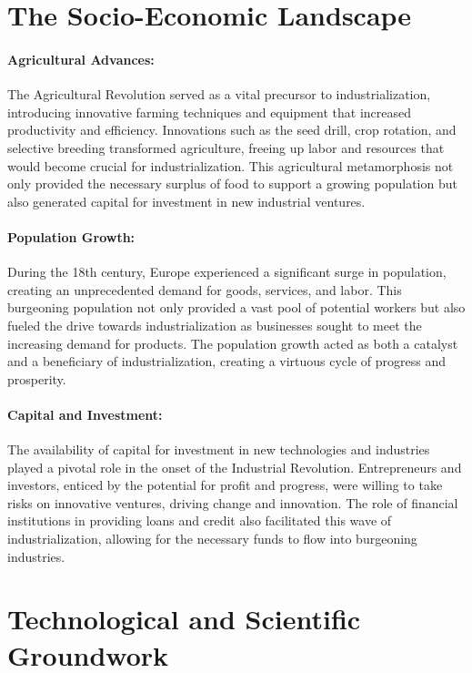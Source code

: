 \documentclass[a4paper,12pt]{book}
\begin{document}
\section*{The Socio-Economic Landscape}

\paragraph{Agricultural Advances:}
The Agricultural Revolution served as a vital precursor to industrialization, introducing innovative farming techniques and equipment that increased productivity and efficiency. Innovations such as the seed drill, crop rotation, and selective breeding transformed agriculture, freeing up labor and resources that would become crucial for industrialization. This agricultural metamorphosis not only provided the necessary surplus of food to support a growing population but also generated capital for investment in new industrial ventures.

\paragraph{Population Growth:}
During the 18th century, Europe experienced a significant surge in population, creating an unprecedented demand for goods, services, and labor. This burgeoning population not only provided a vast pool of potential workers but also fueled the drive towards industrialization as businesses sought to meet the increasing demand for products. The population growth acted as both a catalyst and a beneficiary of industrialization, creating a virtuous cycle of progress and prosperity.

\paragraph{Capital and Investment:}
The availability of capital for investment in new technologies and industries played a pivotal role in the onset of the Industrial Revolution. Entrepreneurs and investors, enticed by the potential for profit and progress, were willing to take risks on innovative ventures, driving change and innovation. The role of financial institutions in providing loans and credit also facilitated this wave of industrialization, allowing for the necessary funds to flow into burgeoning industries.

\section*{Technological and Scientific Groundwork}
\end{document}
